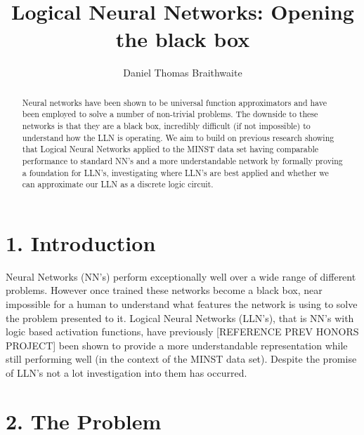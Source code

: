 \documentclass[11pt, a4paper, twoside, openright]{report}
\title{Logical Neural Networks: Opening the black box}
\author{Daniel Thomas Braithwaite}
\date{}
\begin{document}
\frontmatter


\begin{abstract}
Neural networks have been shown to be universal function approximators  and have been employed to solve a number of non-trivial problems. The downside to these networks is that they are a black box, incredibly difficult (if not impossible) to understand how the LLN is operating. We aim to build on previous research showing that Logical Neural Networks applied to the MINST data set having comparable performance to standard NN's and a more understandable network by formally proving a foundation for LLN's, investigating where LLN's are best applied and whether we can approximate our LLN as a discrete logic circuit.
\end{abstract}


\maketitle




\mainmatter


\section*{1. Introduction}

Neural Networks (NN's) perform exceptionally well over a wide range of different problems. However once trained these networks become a black box, near impossible for a human to understand what features the network is using to solve the problem presented to it. Logical Neural Networks (LLN's), that is NN's with logic based activation functions, have previously [REFERENCE PREV HONORS PROJECT] been shown to provide a more understandable representation while still performing well (in the context of the MINST data set). Despite the promise of LLN's not a lot investigation into them has occurred.

\section*{2. The Problem}
\end{document}
